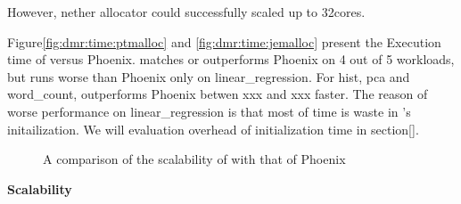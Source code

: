 However, nether allocator could successfully scaled up to 32cores.

Figure\ref{fig:dmr:time:ptmalloc} and \ref{fig:dmr:time:jemalloc}
present the Execution time of \myds versus Phoenix.
\myds matches or outperforms Phoenix on 4 out of 5 workloads,
but runs worse than Phoenix only on linear\_regression.
For hist, pca and word\_count, 
\myds outperforms Phoenix betwen xxx and xxx faster.
The reason of worse performance on linear\_regression 
is that most of time is waste in \myds's initailization.
We will evaluation overhead of initialization time in section\ref{}.



\begin{figure}[htpb]
\centering
  \caption{A comparison of the scalability of \myds with that of Phoenix}
   \label{fig:scalability}
\end{figure}
{\bf Scalability}


